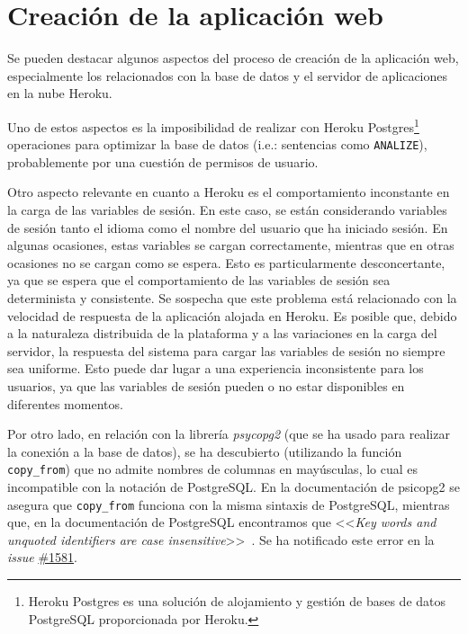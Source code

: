 \section{Creación de la aplicación web}

Se pueden destacar algunos aspectos del proceso de creación de la aplicación web, especialmente los relacionados con la base de datos y el servidor de aplicaciones en la nube Heroku. 

Uno de estos aspectos es la imposibilidad de realizar con Heroku Postgres\footnote{Heroku Postgres es una solución de alojamiento y gestión de bases de datos PostgreSQL proporcionada por Heroku.} operaciones para optimizar la base de datos (i.e.: sentencias como \texttt{ANALIZE}), probablemente por una cuestión de permisos de usuario.

Otro aspecto relevante en cuanto a Heroku es el comportamiento inconstante en la carga de las variables de sesión. En este caso, se están considerando variables de sesión tanto el idioma como el nombre del usuario que ha iniciado sesión. En algunas ocasiones, estas variables se cargan correctamente, mientras que en otras ocasiones no se cargan como se espera. Esto es particularmente desconcertante, ya que se espera que el comportamiento de las variables de sesión sea determinista y consistente. Se sospecha que este problema está relacionado con la velocidad de respuesta de la aplicación alojada en Heroku. Es posible que, debido a la naturaleza distribuida de la plataforma y a las variaciones en la carga del servidor, la respuesta del sistema para cargar las variables de sesión no siempre sea uniforme. Esto puede dar lugar a una experiencia inconsistente para los usuarios, ya que las variables de sesión pueden o no estar disponibles en diferentes momentos.

Por otro lado, en relación con la librería \textit{psycopg2} (que se ha usado para realizar la conexión a la base de datos), se ha descubierto (utilizando la función \texttt{copy\_from}) que no admite nombres de columnas en mayúsculas, lo cual es incompatible con la notación de PostgreSQL. En la documentación de psicopg2 se asegura que \texttt{copy\_from} funciona con la misma sintaxis de PostgreSQL, mientras que, en la documentación de PostgreSQL encontramos que <<\textit{Key words and unquoted identifiers are case insensitive}>>~\cite{bug}. Se ha notificado este error en la \textit{issue} \href{https://github.com/psycopg/psycopg2/issues/1581}{\#1581}.









